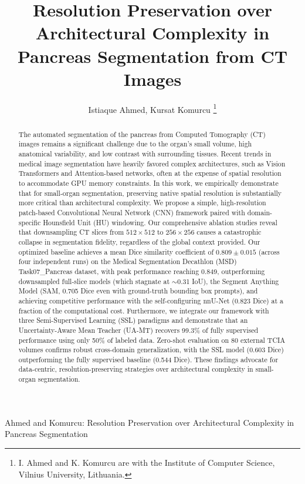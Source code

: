 \documentclass[journal, twocolumn]{IEEEtran}
\begin{document}
\title{Resolution Preservation over Architectural Complexity in Pancreas Segmentation from CT Images}

\author{Istiaque Ahmed,
        Kursat Komurcu
\thanks{I. Ahmed and K. Komurcu are with the Institute of Computer Science, Vilnius University, Lithuania.}
}

%
{Ahmed and Komurcu: Resolution Preservation over Architectural Complexity in Pancreas Segmentation}

\maketitle

\begin{abstract}
The automated segmentation of the pancreas from Computed Tomography (CT) images remains a significant challenge due to the organ's small volume, high anatomical variability, and low contrast with surrounding tissues. Recent trends in medical image segmentation have heavily favored complex architectures, such as Vision Transformers and Attention-based networks, often at the expense of spatial resolution to accommodate GPU memory constraints. In this work, we empirically demonstrate that for small-organ segmentation, preserving native spatial resolution is substantially more critical than architectural complexity. We propose a simple, high-resolution patch-based Convolutional Neural Network (CNN) framework paired with domain-specific Hounsfield Unit (HU) windowing. Our comprehensive ablation studies reveal that downsampling CT slices from $512 \times 512$ to $256 \times 256$ causes a catastrophic collapse in segmentation fidelity, regardless of the global context provided. Our optimized baseline achieves a mean Dice similarity coefficient of $0.809 \pm 0.015$ (across four independent runs) on the Medical Segmentation Decathlon (MSD) Task07\_Pancreas dataset, with peak performance reaching 0.849, outperforming downsampled full-slice models (which stagnate at $\sim$0.31 IoU), the Segment Anything Model (SAM, 0.705 Dice even with ground-truth bounding box prompts), and achieving competitive performance with the self-configuring nnU-Net (0.823 Dice) at a fraction of the computational cost. Furthermore, we integrate our framework with three Semi-Supervised Learning (SSL) paradigms and demonstrate that an Uncertainty-Aware Mean Teacher (UA-MT) recovers 99.3\% of fully supervised performance using only 50\% of labeled data. Zero-shot evaluation on 80 external TCIA volumes confirms robust cross-domain generalization, with the SSL model (0.603 Dice) outperforming the fully supervised baseline (0.544 Dice). These findings advocate for data-centric, resolution-preserving strategies over architectural complexity in small-organ segmentation.
\end{abstract}
\end{document}
